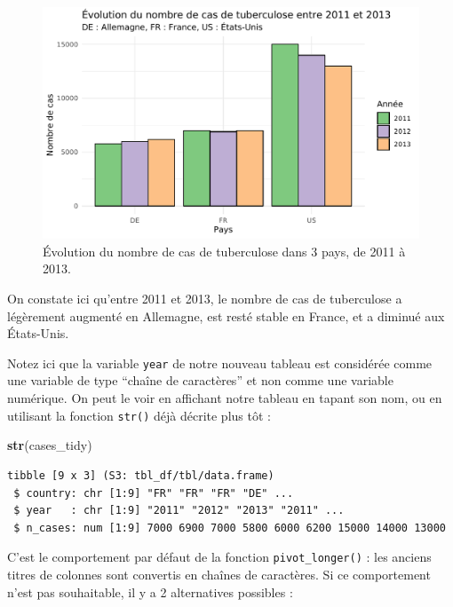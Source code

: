 \documentclass[
  a4paper,
]{article}
\newenvironment{Shaded}{\begin{snugshade}}{\end{snugshade}}
\newcommand{\KeywordTok}[1]{\textcolor[rgb]{0.12,0.11,0.11}{\textbf{#1}}}
\newcommand{\NormalTok}[1]{\textcolor[rgb]{0.12,0.11,0.11}{#1}}
\begin{document}
\begin{figure}[htpb]

{\centering \includegraphics[width=0.9\linewidth]{figure/casesbarplot-1} 

}

\caption{Évolution du nombre de cas de tuberculose dans 3 pays, de 2011 à 2013.}\label{fig:casesbarplot}
\end{figure}

On constate ici qu'entre 2011 et 2013, le nombre de cas de tuberculose a légèrement augmenté en Allemagne, est resté stable en France, et a diminué aux États-Unis.

Notez ici que la variable \texttt{year} de notre nouveau tableau est considérée comme une variable de type ``chaîne de caractères'' et non comme une variable numérique. On peut le voir en affichant notre tableau en tapant son nom, ou en utilisant la fonction \texttt{str()} déjà décrite plus tôt :

\begin{Shaded}
\begin{Highlighting}[]
\KeywordTok{str}\NormalTok{(cases_tidy)}
\end{Highlighting}
\end{Shaded}

\begin{verbatim}
tibble [9 x 3] (S3: tbl_df/tbl/data.frame)
 $ country: chr [1:9] "FR" "FR" "FR" "DE" ...
 $ year   : chr [1:9] "2011" "2012" "2013" "2011" ...
 $ n_cases: num [1:9] 7000 6900 7000 5800 6000 6200 15000 14000 13000
\end{verbatim}

C'est le comportement par défaut de la fonction \texttt{pivot\_longer()} : les anciens titres de colonnes sont convertis en chaînes de caractères. Si ce comportement n'est pas souhaitable, il y a 2 alternatives possibles :
\end{document}
